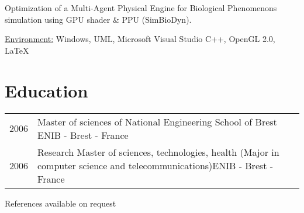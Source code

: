 \documentclass[10pt,letterpaper]{resume/resume}
\begin{document}
\begin{minipage}[t]{\linewidth}
\par Optimization of a Multi-Agent Physical Engine for Biological Phenomenons simulation using GPU shader \& PPU (SimBioDyn).
\par\underline{Environment:} Windows, UML, Microsoft Visual Studio C++, OpenGL 2.0, \LaTeX
%
  \end{minipage}

  \begin{minipage}[t]{\linewidth}
    \section{Education}
      \begin{tabularx}{\linewidth}{lX}%
        2006 & Master of sciences of National Engineering School of Brest \hfill ENIB - Brest - France\\ 
        2006 & Research Master of sciences, technologies, health (Major in computer science and telecommunications)\hfill ENIB - Brest - France\\
      \end{tabularx}%
  \end{minipage}

  \vfill
  \begin{center}References available on request\end{center}
\end{document}
